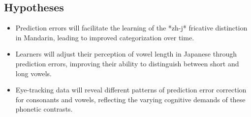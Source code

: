 \subsection{Hypotheses}

\begin{itemize}
    \item Prediction errors will facilitate the learning of the *zh-j* fricative distinction in Mandarin, leading to improved categorization over time.
    \item Learners will adjust their perception of vowel length in Japanese through prediction errors, improving their ability to distinguish between short and long vowels.
    \item Eye-tracking data will reveal different patterns of prediction error correction for consonants and vowels, reflecting the varying cognitive demands of these phonetic contrasts.
\end{itemize}
